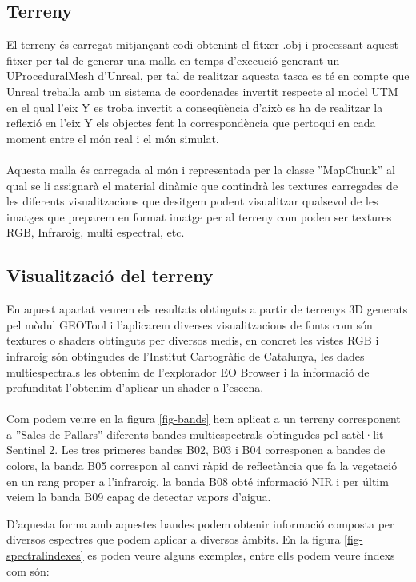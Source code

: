 \documentclass[10pt,a4paper,twocolumn,twoside]{article}
\begin{document}
\subsection{Terreny}
El terreny és carregat mitjançant codi obtenint el fitxer .obj i processant aquest fitxer per tal de generar una malla en temps d'execució generant un UProceduralMesh\cite{uprocedural} d'Unreal, per tal de realitzar aquesta tasca es té en compte que Unreal treballa amb un sistema de coordenades invertit respecte al model UTM en el qual l'eix Y es troba invertit a conseqüència d'això es ha de realitzar la reflexió en l'eix Y els objectes fent la correspondència que pertoqui en cada moment entre el món real i el món simulat.
\\
\\
Aquesta malla és carregada al món i representada per la classe ''MapChunk'' al qual se li assignarà el material dinàmic que contindrà les textures carregades de les diferents visualitzacions que desitgem podent visualitzar qualsevol de les imatges que preparem en format imatge per al terreny com poden ser textures RGB, Infraroig, multi espectral, etc.

\subsection{Visualització del terreny}
En aquest apartat veurem els resultats obtinguts a partir de terrenys 3D generats pel mòdul GEOTool i l'aplicarem diverses visualitzacions de fonts com són textures o shaders obtinguts per diversos medis, en concret les vistes RGB i infraroig són obtingudes de l'Institut Cartogràfic de Catalunya, les dades multiespectrals les obtenim de l'explorador EO Browser\cite{eobrowser} i la informació de profunditat l'obtenim d'aplicar un shader a l'escena.
\\
\\
Com podem veure en la figura \ref{fig-bands} hem aplicat a un terreny corresponent a ''Sales de Pallars'' diferents bandes multiespectrals obtingudes pel satèl·lit Sentinel 2\cite{sentinel2}. Les tres primeres bandes B02, B03 i B04 corresponen a bandes de colors, la banda B05 correspon al canvi ràpid de reflectància que fa la vegetació en un rang proper a l'infraroig, la banda B08 obté informació NIR\cite{nir} i per últim veiem la banda B09 capaç de detectar vapors d'aigua.

D'aquesta forma amb aquestes bandes podem obtenir informació composta per diversos espectres que podem aplicar a diversos àmbits. En la figura \ref{fig-spectralindexes} es poden veure alguns exemples, entre ells podem veure índexs com són:
\end{document}
